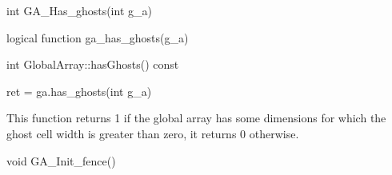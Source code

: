 \documentclass[12pt]{article}
\begin{document}
\begin{capi}
\begin{ccode}
int GA_Has_ghosts(int g_a)
\end{ccode}
\begin{funcargs}
\end{funcargs}
\end{capi}

\begin{fapi}
\begin{fcode}
logical function ga_has_ghosts(g_a)
\end{fcode}
\begin{funcargs}
\end{funcargs}
\end{fapi}

\begin{cxxapi}
\begin{cxxcode}
int GlobalArray::hasGhosts() const
\end{cxxcode}
\begin{funcargs}
\end{funcargs}
\end{cxxapi}

\begin{pyapi}
\begin{pycode}
ret = ga.has_ghosts(int g_a)
\end{pycode}
\begin{funcargs}
\end{funcargs}
\end{pyapi}

\gcoll

\begin{desc}

This function returns 1 if the global array has some dimensions for which the
ghost cell width is greater than zero, it returns 0 otherwise.

\end{desc}


\begin{capi}
\begin{ccode}
void GA_Init_fence()
\end{ccode}
\end{capi}
\end{document}
